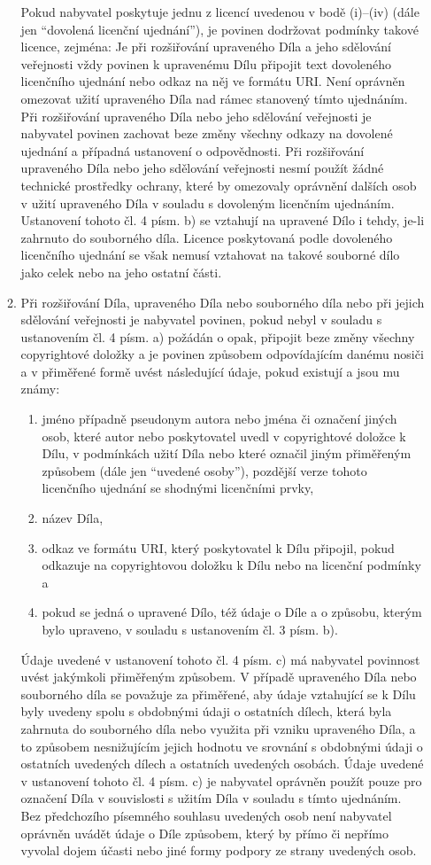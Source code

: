 \begin{enumerate}
\begin{enumerate}
Pokud nabyvatel poskytuje jednu z licencí uvedenou v bodě (i)–(iv) (dále jen ``dovolená licenční ujednání''), je povinen dodržovat podmínky takové licence, zejména: Je při rozšiřování upraveného Díla a jeho sdělování veřejnosti vždy povinen k upravenému Dílu připojit text dovoleného licenčního ujednání nebo odkaz na něj ve formátu URI. Není oprávněn omezovat užití upraveného Díla nad rámec stanovený tímto ujednáním. Při rozšiřování upraveného Díla nebo jeho sdělování veřejnosti je nabyvatel povinen zachovat beze změny všechny odkazy na dovolené ujednání a případná ustanovení o odpovědnosti. Při rozšiřování upraveného Díla nebo jeho sdělování veřejnosti nesmí použít žádné technické prostředky ochrany, které by omezovaly oprávnění dalších osob v užití upraveného Díla v souladu s dovoleným licenčním ujednáním. Ustanovení tohoto čl. 4 písm. b) se vztahují na upravené Dílo i tehdy, je-li zahrnuto do souborného díla. Licence poskytovaná podle dovoleného licenčního ujednání se však nemusí vztahovat na takové souborné dílo jako celek nebo na jeho ostatní části.
      \item Při rozšiřování Díla, upraveného Díla nebo souborného díla nebo při jejich sdělování veřejnosti je nabyvatel povinen, pokud nebyl v souladu s ustanovením čl. 4 písm. a) požádán o opak, připojit beze změny všechny copyrightové doložky a je povinen způsobem odpovídajícím danému nosiči a v přiměřené formě uvést následující údaje, pokud existují a jsou mu známy:
        \begin{enumerate}
          \item jméno případně pseudonym autora nebo jména či označení jiných osob, které autor nebo poskytovatel uvedl v copyrightové doložce k Dílu, v podmínkách užití Díla nebo které označil jiným přiměřeným způsobem (dále jen ``uvedené osoby''), pozdější verze tohoto licenčního ujednání se shodnými licenčními prvky,
          \item název Díla,
          \item odkaz ve formátu URI, který poskytovatel k Dílu připojil, pokud odkazuje na copyrightovou doložku k Dílu nebo na licenční podmínky a
          \item pokud se jedná o upravené Dílo, též údaje o Díle a o způsobu, kterým bylo upraveno, v souladu s ustanovením čl. 3 písm. b).
        \end{enumerate}
Údaje uvedené v ustanovení tohoto čl. 4 písm. c) má nabyvatel povinnost uvést jakýmkoli přiměřeným způsobem. V případě upraveného Díla nebo souborného díla se považuje za přiměřené, aby údaje vztahující se k Dílu byly uvedeny spolu s obdobnými údaji o ostatních dílech, která byla zahrnuta do souborného díla nebo využita při vzniku upraveného Díla, a to způsobem nesnižujícím jejich hodnotu ve srovnání s obdobnými údaji o ostatních uvedených dílech a ostatních uvedených osobách. Údaje uvedené v ustanovení tohoto čl. 4 písm. c) je nabyvatel oprávněn použít pouze pro označení Díla v souvislosti s užitím Díla v souladu s tímto ujednáním. Bez předchozího písemného souhlasu uvedených osob není nabyvatel oprávněn uvádět údaje o Díle způsobem, který by přímo či nepřímo vyvolal dojem účasti nebo jiné formy podpory ze strany uvedených osob.

\end{enumerate}
\end{enumerate}
